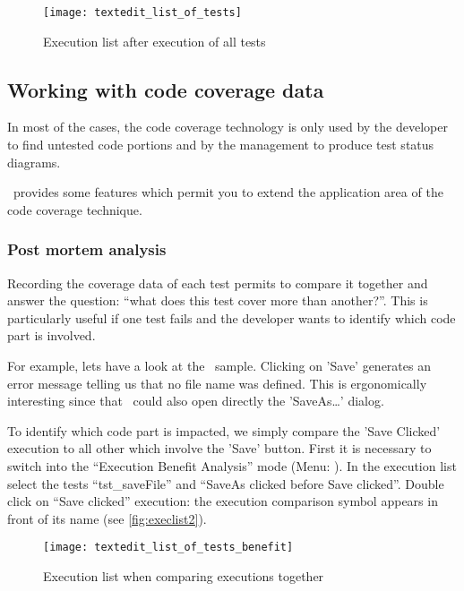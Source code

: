 \begin{figure}[H]
  \begin{center}
    \texttt{[image: textedit\_list\_of\_tests]}
  \end{center}
  \caption{Execution list after execution of all tests}
  \label{fig:execlist1}
\end{figure}


\subsection{Working with code coverage data}

In most of the cases, the code coverage technology is only used by the
developer to find untested code portions and by the management to produce test
status diagrams. 

\TestCocoon\ provides some features which permit you to extend the application
area of the code coverage technique.


\subsubsection{Post mortem analysis}

Recording the coverage data of each test permits to compare it together and
answer the question: ``what does this test cover more than another?''. This is
particularly useful if one test fails and the developer wants to identify which
code part is involved.

For example, lets have a look at the \TextEdit\ sample. Clicking on '\textsf{Save}' generates
an error message telling us that no file name was defined. This is ergonomically
interesting since that
\TextEdit\ could also open directly the '\textsf{SaveAs\ldots}' dialog. 

To identify which code part is impacted, we simply compare the '\textsf{Save Clicked}'
execution to all other which involve the '\textsf{Save}' button. First it is necessary
to switch into the ``Execution Benefit Analysis'' mode
(Menu: ). In the execution list select
the tests ``\textsf{tst\_saveFile}'' and ``\textsf{SaveAs clicked before Save clicked}''. Double
click on ``\textsf{Save clicked}'' execution: the execution comparison symbol appears in
front of its name (see \autoref{fig:execlist2}).

\begin{figure}[H]
  \begin{center}
    \texttt{[image: textedit\_list\_of\_tests\_benefit]}
  \end{center}
  \caption{Execution list when comparing executions together}
  \label{fig:execlist2}
\end{figure}

